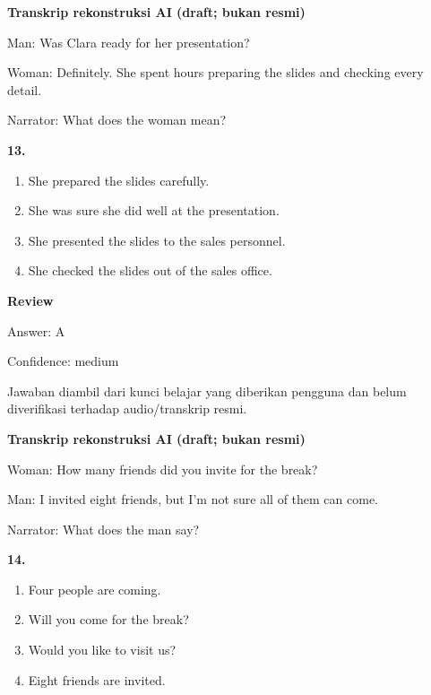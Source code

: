 \documentclass[12pt]{article}
\begin{document}
\endgroup
\par
\vspace{0.25\baselineskip}
\begin{exampleblock}
\textbf{Transkrip rekonstruksi AI (draft; bukan resmi)}\par
Man: Was Clara ready for her presentation?\par
Woman: Definitely. She spent hours preparing the slides and checking every detail.\par
Narrator: What does the woman mean?\par
\end{exampleblock}
\noindent\textbf{13.}
\begin{enumerate}[label=(\Alph*),leftmargin=*,itemsep=0.2em]
\item She prepared the slides carefully.
\item She was sure she did well at the presentation.
\item She presented the slides to the sales personnel.
\item She checked the slides out of the sales office.
\end{enumerate}
\par
\begingroup
\setlength{\parskip}{0pt}
\setlength{\parindent}{0pt}
\textbf{Review}\par
Answer: A\par
Confidence: medium\par
Jawaban diambil dari kunci belajar yang diberikan pengguna dan belum diverifikasi terhadap audio/transkrip resmi.\par
\endgroup
\par
\vspace{0.25\baselineskip}
\begin{exampleblock}
\textbf{Transkrip rekonstruksi AI (draft; bukan resmi)}\par
Woman: How many friends did you invite for the break?\par
Man: I invited eight friends, but I'm not sure all of them can come.\par
Narrator: What does the man say?\par
\end{exampleblock}
\noindent\textbf{14.}
\begin{enumerate}[label=(\Alph*),leftmargin=*,itemsep=0.2em]
\item Four people are coming.
\item Will you come for the break?
\item Would you like to visit us?
\item Eight friends are invited.
\end{enumerate}
\end{document}
